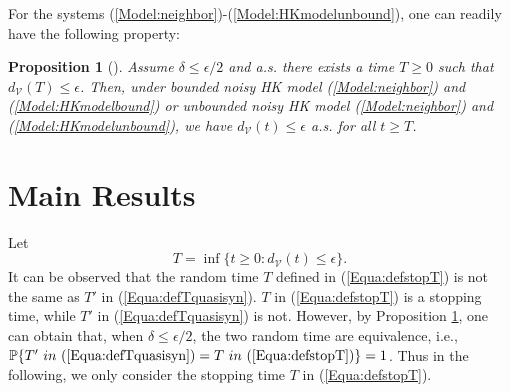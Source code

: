 \documentclass[11pt]{article}
\newtheorem{prop}[thm]{Proposition}
\theoremstyle{definition}
\theoremstyle{remark}
\numberwithin{equation}{section}
\begin{document}
For the systems (\ref{Model:neighbor})-(\ref{Model:HKmodelunbound}), one can readily have the following property:
\begin{prop}[\cite{Su2017auto,Su2019tac}]\label{Prop:quasisynHK}
Assume  $\delta\leq \epsilon/2$ and
a.s. there exists a time  $T\geq 0$  such that $d_{\mathcal{V}}(T)\leq \epsilon$. Then, under bounded noisy HK model (\ref{Model:neighbor}) and (\ref{Model:HKmodelbound}) or unbounded noisy HK model (\ref{Model:neighbor}) and (\ref{Model:HKmodelunbound}), we have $d_{\mathcal{V}}(t)\leq \epsilon$ a.s. for all $t\geq T$.
\end{prop}
%

\section{Main Results}\label{Section:Results}
Let
\begin{equation}\label{Equa:defstopT}
 T=\inf\{t\geq 0: d_\mathcal{V}(t)\leq \epsilon\}.
\end{equation}
 It can be observed that the random time $T$ defined in (\ref{Equa:defstopT}) is not the same as $T'$ in (\ref{Equa:defTquasisyn}). $T$ in (\ref{Equa:defstopT}) is a stopping time, while $T'$ in (\ref{Equa:defTquasisyn}) is not. However, by Proposition \ref{Prop:quasisynHK}, one can obtain that, when $\delta\leq \epsilon/2$, the two random time are equivalence, i.e., $\mathbb{P}\{T' ~in~ (\ref{Equa:defTquasisyn})=T~ in~ (\ref{Equa:defstopT})\}=1$. Thus in the following, we only consider the stopping time $T$ in (\ref{Equa:defstopT}).
\end{document}
